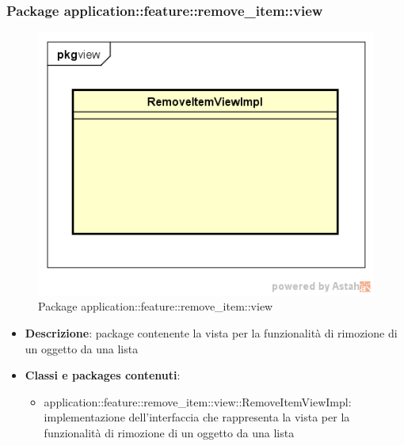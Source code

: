 \subsubsection{Package application::feature::remove\_item::view}
\label{Package application::feature::remove_item::view}
\begin{figure}[H]
	\centering
	\includegraphics[scale=0.5]{Sezioni/Packages/Application/remove_item_view.png}
	\caption{Package application::feature::remove\_item::view}
\end{figure}
\begin{itemize}
	\item \textbf{Descrizione}: package contenente la vista per la funzionalità di rimozione di un oggetto da una lista
	\item \textbf{Classi e packages contenuti}:
	\begin{itemize}
	\item application::feature::remove\_item::view::RemoveItemViewImpl: implementazione dell'interfaccia che rappresenta la vista per la funzionalità di rimozione di un oggetto da una lista
	\end{itemize}
\end{itemize}

